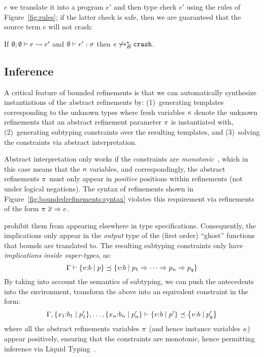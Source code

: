  $e$ we translate it
into a \corelan program $e'$ and then type check $e'$ using the rules of Figure~\ref{fig:rules}; 
if the latter check is safe, then we are guaranteed that the source term $e$ will
not crash:

\begin{theorem*}[Soundness]
\label{theorem:bounded}
If $ \emptyset; \emptyset \vdash e \rightsquigarrow e'$ and
   $\emptyset \vdash e' : \sigma$
then $e \not \hookrightarrow_B^{\star} {\mathtt{crash}} $.
\end{theorem*}

\subsection{Inference}\label{sec:infer}

A critical feature of bounded refinements is that we can
automatically synthesize instantiations of the abstract
refinements by:
%
(1)~generating templates corresponding to the unknown types
    where fresh variables $\kappa$ denote the unknown refinements
    that an abstract refinement parameter $\pi$ is instantiated
    with,
(2)~generating subtyping constraints over the resulting templates,
    and
(3)~solving the constraints via abstract interpretation.

Abstract interpretation only works if the constraints
are \emph{monotonic}~\citep{cousotcousot77}, which in this case
means that the $\kappa$ variables, and correspondingly,
the abstract refinements $\pi$ must only appear in
\emph{positive} positions within refinements (\ie not
under logical negations).
%
The syntax of refinements shown in Figure~\ref{fig:boundedrefinements:syntax}
violates this requirement via refinements of the
form ${\pi \ \overline{x}} \Rightarrow e$.
%

 \ie prohibit
them from appearing elsewhere in type specifications.
%
Consequently, the implications only appear in the
\emph{output} type of the (first order) ``ghost''
functions that bounds are translated to.
%
The resulting subtyping constraints only have
\emph{implications inside super-types}, \ie as:
$$
\Gamma \vdash \left\lbrace v\text{:}b\mid p\right\rbrace \preceq \left\lbrace v\text{:}b\mid p_1 \Rightarrow \dots \Rightarrow p_{n} \Rightarrow p_q\right\rbrace
$$
%
By taking into account the semantics of subtyping, we can
push the antecedents into the environment, \ie transform
the above into an equivalent constraint in the form:
$$
\isSubType{
\EXTT{
 \EXTT{\Gamma}{x_1}{\sxref{b_1}{\areft_1'}{x_1}},\dots
}{x_n}{\sxref{b_n}{\areft_n'}{x_n}}
}
{\stref{b}{\areft'}}
{\stref{b}{\areft_q'}}
$$
where all the abstract refinements variables $\pi$
(and hence instance variables $\kappa$) appear positively,
ensuring that the constraints are monotonic, hence permitting
inference via Liquid Typing~\citep{LiquidPLDI08}.

